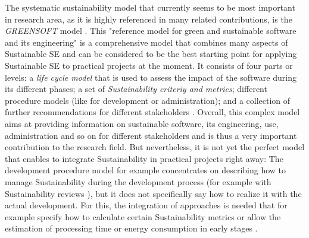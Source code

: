 \documentclass[oribibl]{llncs}
\begin{document}
The systematic sustainability model that currently seems to be most important %
in research area, as it is highly referenced in many related contributions, is the \textit{GREENSOFT} model \cite{naumann_greensoft_2011}. This "reference model for green and sustainable software and its engineering" \cite[p.\,1]{naumann_greensoft_2011} is a comprehensive model that combines many aspects of Sustainable SE %
and can be considered to be the best starting point for applying Sustainable SE to practical projects at the moment. It consists of four parts or levels: a \textit{life cycle model} that is used to assess the impact of the software during its different phases; a set of \textit{Sustainability criteriy and metrics}; different procedure models (like for development or administration); and a collection of further recommendations for different stakeholders \cite{naumann_greensoft_2011}.
Overall, this complex model aims at providing information on sustainable software, its engineering, use, administration and so on for different stakeholders and is thus a very important contribution to the research field. But nevertheless, it is not yet the perfect model that enables to integrate Sustainability in practical projects right away: The development procedure model for example concentrates on describing how to manage Sustainability %
during the development process (for example with Sustainability reviews \cite{naumann_greensoft_2011}), but it does not specifically say how to realize it with the actual development. For this, the integration of approaches is needed that for example specify how to calculate certain Sustainability metrics or allow the estimation of processing time or energy consumption in early stages \cite{naumann_greensoft_2011}. %
\end{document}
